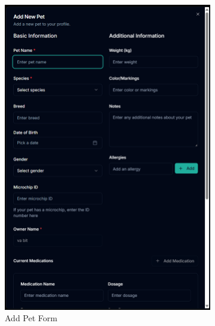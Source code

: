 \documentclass[12pt,a4paper,twoside]{book}
\begin{document}
\begin{figure}[H]
    \centering
    \begin{subfigure}[b]{0.48\textwidth}
        \centering
        \includegraphics[width=\textwidth,height=0.4\textheight,keepaspectratio]{Resources/Final UI/add-pet.png}
        \caption{Add Pet Form}\label{fig:add-pet-screen}
    \end{subfigure}
    \hfill
    \begin{subfigure}[b]{0.48\textwidth}
        \centering

\end{subfigure}
\end{figure}
\end{document}
